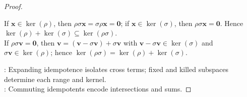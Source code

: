 \begin{theorem}
\begin{proof}
\begin{enumerate}[label=(\roman*)]
If $\mathbf{x}\in\ker(\rho)$, then $\rho\sigma\mathbf{x}=\sigma\rho\mathbf{x}=\mathbf{0}$; if $\mathbf{x}\in\ker(\sigma)$, then $\rho\sigma\mathbf{x}=\mathbf{0}$. Hence $\ker(\rho)+\ker(\sigma)\subseteq\ker(\rho\sigma)$.\\
If $\rho\sigma\mathbf{v}=\mathbf{0}$, then $\mathbf{v}=(\mathbf{v}-\sigma\mathbf{v})+\sigma\mathbf{v}$ with $\mathbf{v}-\sigma\mathbf{v}\in\ker(\sigma)$ and $\sigma\mathbf{v}\in\ker(\rho)$; hence $\ker(\rho\sigma)=\ker(\rho)+\ker(\sigma)$.
\end{enumerate}
: Expanding idempotence isolates cross terms; fixed and killed subspaces determine each range and kernel.\\
: Commuting idempotents encode intersections and sums.
\end{proof}
\end{theorem}
